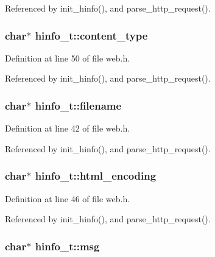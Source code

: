 Referenced by init\-\_\-hinfo(), and parse\-\_\-http\-\_\-request().

\hypertarget{structhinfo__t_a87bad5ce6af7ed3613a61d01aef94d8d}{
\subsubsection[{content\-\_\-type}]{\setlength{\rightskip}{0pt plus 5cm}char$\ast$ hinfo\-\_\-t\-::content\-\_\-type}}\label{structhinfo__t_a87bad5ce6af7ed3613a61d01aef94d8d}


Definition at line 50 of file web.\-h.



Referenced by init\-\_\-hinfo(), and parse\-\_\-http\-\_\-request().

\hypertarget{structhinfo__t_a874ffdf5ade4e3844d7719444495e89c}{
\subsubsection[{filename}]{\setlength{\rightskip}{0pt plus 5cm}char$\ast$ hinfo\-\_\-t\-::filename}}\label{structhinfo__t_a874ffdf5ade4e3844d7719444495e89c}


Definition at line 42 of file web.\-h.



Referenced by init\-\_\-hinfo(), and parse\-\_\-http\-\_\-request().

\hypertarget{structhinfo__t_ac03bcdde52e49a14bf9112f295f216b5}{
\subsubsection[{html\-\_\-encoding}]{\setlength{\rightskip}{0pt plus 5cm}char$\ast$ hinfo\-\_\-t\-::html\-\_\-encoding}}\label{structhinfo__t_ac03bcdde52e49a14bf9112f295f216b5}


Definition at line 46 of file web.\-h.



Referenced by init\-\_\-hinfo(), and parse\-\_\-http\-\_\-request().

\hypertarget{structhinfo__t_a06469570091ad74724457998e07d5b56}{
\subsubsection[{msg}]{\setlength{\rightskip}{0pt plus 5cm}char$\ast$ hinfo\-\_\-t\-::msg}}\label{structhinfo__t_a06469570091ad74724457998e07d5b56}


